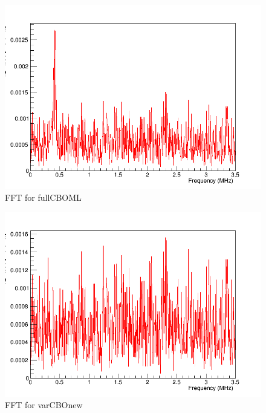 \begin{figure}[!h]
\centering 
\includegraphics[scale=0.5]{Figures/fullCBOML_fft.png}
\decoRule
\caption{FFT for fullCBOML}
\label{fig:fullCBOML_fft}
\end{figure}
\fi

\begin{figure}[!h]
\centering 
\includegraphics[scale=0.5]{Figures/varCBOnew_fft.png}
\decoRule
\caption{FFT for varCBOnew}
\label{fig:varCBOnew_fft}
\end{figure}

